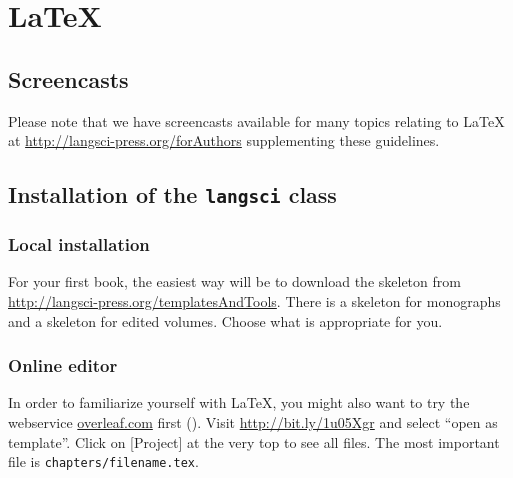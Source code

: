 \chapter{\LaTeX\xspace}

\section{Screencasts}
Please note that we have screencasts available for many topics relating to {\LaTeX\xspace} at \url{http://langsci-press.org/forAuthors} supplementing these guidelines.

\section{Installation of the \texttt{langsci} class}
\subsection{Local installation}
For your first book, the easiest way will be to download the skeleton from \url{http://langsci-press.org/templatesAndTools}.
There is a skeleton for monographs and a skeleton for edited volumes. Choose what is appropriate for you.
 


\subsection{Online editor}
In order to familiarize yourself with \LaTeX\xspace, you might also want to try the webservice \url{overleaf.com} first (). Visit \url{http://bit.ly/1u05Xgr} and select ``open as template''. Click on [Project] at the very top to see all files. The most important file is \verb+chapters/filename.tex+.


